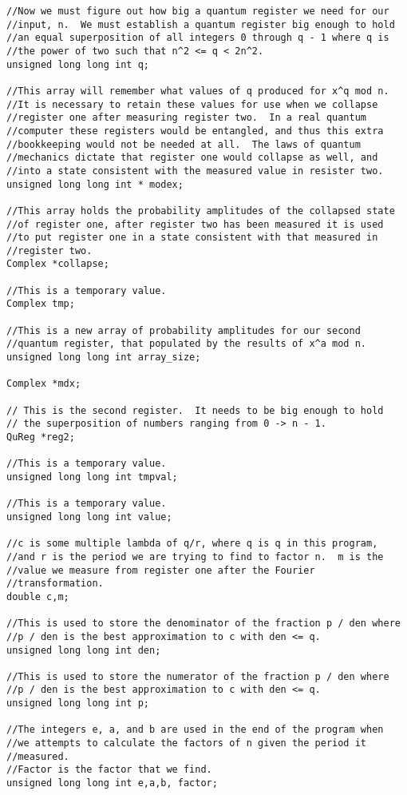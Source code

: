 \documentclass[]{article}
\begin{document}
\begin{verbatim}
//Now we must figure out how big a quantum register we need for our
//input, n.  We must establish a quantum register big enough to hold
//an equal superposition of all integers 0 through q - 1 where q is
//the power of two such that n^2 <= q < 2n^2.
unsigned long long int q;

//This array will remember what values of q produced for x^q mod n.
//It is necessary to retain these values for use when we collapse
//register one after measuring register two.  In a real quantum
//computer these registers would be entangled, and thus this extra
//bookkeeping would not be needed at all.  The laws of quantum
//mechanics dictate that register one would collapse as well, and
//into a state consistent with the measured value in resister two.
unsigned long long int * modex;     

//This array holds the probability amplitudes of the collapsed state
//of register one, after register two has been measured it is used
//to put register one in a state consistent with that measured in
//register two.
Complex *collapse;

//This is a temporary value.
Complex tmp;

//This is a new array of probability amplitudes for our second
//quantum register, that populated by the results of x^a mod n.
unsigned long long int array_size;

Complex *mdx; 

// This is the second register.  It needs to be big enough to hold
// the superposition of numbers ranging from 0 -> n - 1.
QuReg *reg2; 

//This is a temporary value.
unsigned long long int tmpval;
  
//This is a temporary value.
unsigned long long int value;
  
//c is some multiple lambda of q/r, where q is q in this program,
//and r is the period we are trying to find to factor n.  m is the
//value we measure from register one after the Fourier
//transformation.
double c,m; 

//This is used to store the denominator of the fraction p / den where
//p / den is the best approximation to c with den <= q.
unsigned long long int den;

//This is used to store the numerator of the fraction p / den where
//p / den is the best approximation to c with den <= q.
unsigned long long int p;

//The integers e, a, and b are used in the end of the program when
//we attempts to calculate the factors of n given the period it
//measured.
//Factor is the factor that we find.
unsigned long long int e,a,b, factor;


\end{verbatim}
\end{document}
